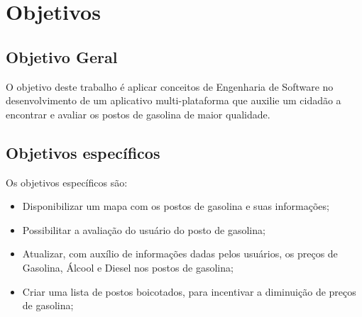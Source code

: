 \section{Objetivos}

\subsection{Objetivo Geral}

O objetivo deste trabalho é aplicar conceitos de Engenharia de Software no desenvolvimento de um aplicativo multi-plataforma que auxilie um cidadão a encontrar e avaliar os postos de gasolina de maior qualidade.

\subsection{Objetivos específicos}

Os objetivos específicos são:
\begin{itemize}
    \item Disponibilizar um mapa com os postos de gasolina e suas informações;
    \item Possibilitar a avaliação do usuário do posto de gasolina;
    \item Atualizar, com auxílio de informações dadas pelos usuários, os preços de Gasolina, Álcool e Diesel nos postos de gasolina;
    \item Criar uma lista de postos boicotados, para incentivar a diminuição de preços de gasolina;
\end{itemize}
